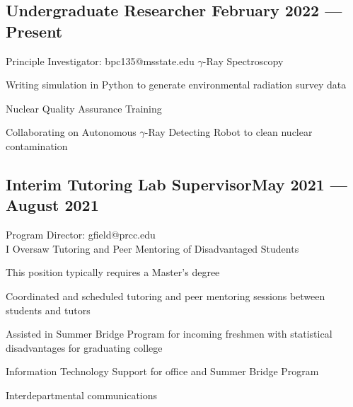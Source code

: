 \documentclass[a4paper,12pt]{article}
\begin{document}


\subsection{{Undergraduate Researcher \hfill February 2022 --- Present}}
Principle Investigator: bpc135@msstate.edu 
\vspace*{2pt}
$\gamma$-Ray Spectroscopy
\begin{zitemize}
\item Writing simulation in Python to generate environmental radiation survey data
\item Nuclear Quality Assurance Training
\item Collaborating on Autonomous $\gamma$-Ray Detecting Robot to clean nuclear contamination 
\end{zitemize}
\vspace{7pt}

\subsection{{Interim Tutoring Lab Supervisor\hfill May 2021 --- August 2021}}
Program Director:  gfield@prcc.edu \\
\vspace*{2pt}
I Oversaw Tutoring and Peer Mentoring of Disadvantaged Students
\begin{zitemize}
\item This position typically requires a Master’s degree
\item Coordinated and scheduled tutoring and peer mentoring sessions between students and tutors
\item Assisted in Summer Bridge Program for incoming freshmen with statistical disadvantages for graduating college
\item Information Technology Support for office and Summer Bridge Program
\item Interdepartmental communications
\end{zitemize}
\vspace{7pt}
\end{document}
